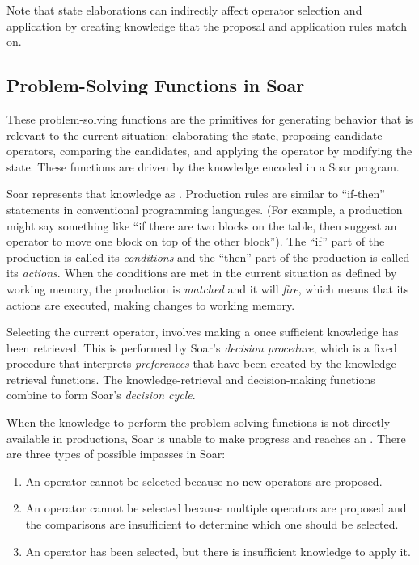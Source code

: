 Note that state elaborations can indirectly affect operator selection and application by creating knowledge that the proposal and application rules match on.

\subsection{Problem-Solving Functions in Soar}
\label{ARCH-functions}

These problem-solving functions are the primitives for generating behavior that is relevant to the current situation: elaborating the state, proposing candidate operators, comparing the candidates, and applying the operator by modifying the state. These functions are driven by the knowledge encoded in a Soar program.
 
Soar represents that knowledge as . Production rules are similar to ``if-then'' statements in conventional programming languages. (For example, a production might say something like ``if there are two blocks on the table, then suggest an operator to move one block on top of the other block''). The ``if'' part of the production is called its \textit{conditions} and the ``then'' part of the production is called its \textit{actions}. When the conditions are met in the current situation as defined by working memory, the production is \emph{matched} and it will \emph{fire}, which means that its actions are executed, making changes to working memory.

Selecting the current operator, involves making a  once sufficient knowledge has been retrieved. This is performed by Soar's \emph{decision procedure}, which is a fixed procedure that interprets \emph{preferences} that have been created by the knowledge retrieval functions. The knowledge-retrieval and decision-making functions combine to form Soar's \emph{decision cycle}.

When the knowledge to perform the problem-solving functions is not directly available in productions, Soar is unable to make progress and reaches an .  There are three types of possible impasses in Soar:

\vspace{-8pt}
\begin{enumerate}
	\item An operator cannot be selected because no new operators are proposed.
	\vspace{-6pt}
	\item An operator cannot be selected because multiple operators are proposed and the comparisons are insufficient to determine which one should be selected.
	\vspace{-6pt}
	\item An operator has been selected, but there is insufficient knowledge to apply it.
	\vspace{-6pt}
\end{enumerate}

